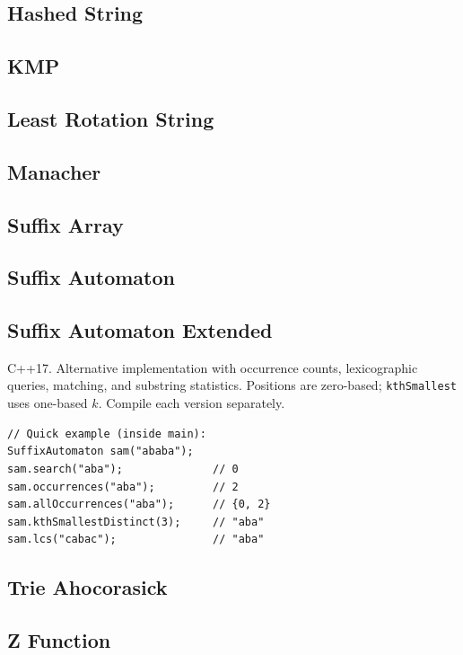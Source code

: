 

\subsection{Hashed String}

\subsection{KMP}

\subsection{Least Rotation String}

\subsection{Manacher}

\subsection{Suffix Array}

\subsection{Suffix Automaton}


\subsection{Suffix Automaton Extended}
C++17. Alternative implementation with occurrence counts, lexicographic
queries, matching, and substring statistics. Positions are zero-based;
\texttt{kthSmallest} uses one-based $k$. Compile each version separately.
\begin{lstlisting}[style=C++]
// Quick example (inside main):
SuffixAutomaton sam("ababa");
sam.search("aba");              // 0
sam.occurrences("aba");         // 2
sam.allOccurrences("aba");      // {0, 2}
sam.kthSmallestDistinct(3);     // "aba"
sam.lcs("cabac");               // "aba"
\end{lstlisting}

\subsection{Trie Ahocorasick}

\subsection{Z Function}
